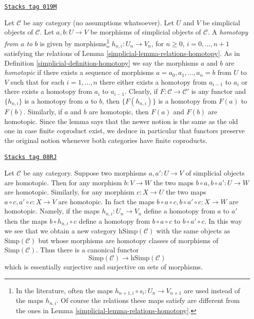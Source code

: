 \begin{remark}
\label{simplicial-remark-homotopy-better}
\href{https://stacks.math.columbia.edu/tag/019M}{\texttt{Stacks tag 019M}}

Let $\mathcal{C}$ be any category (no assumptions whatsoever). Let
$U$ and $V$ be simplicial objects of $\mathcal{C}$. Let $a, b : U \to V$
be morphisms of simplicial objects of $\mathcal{C}$. A
{\it homotopy from $a$ to $b$} is given by
morphisms\footnote{In the literature, often the maps
$h_{n + 1, i} \circ s_i : U_n \to V_{n + 1}$ are used instead
of the maps $h_{n, i}$. Of course the relations these maps satisfy
are different from the ones in Lemma \ref{simplicial-lemma-relations-homotopy}.}
$h_{n, i} : U_n \to V_n$, for $n \geq 0$, $i = 0, \ldots, n + 1$
satisfying the relations of Lemma \ref{simplicial-lemma-relations-homotopy}.
As in Definition \ref{simplicial-definition-homotopy} we say the morphisms $a$ and $b$
are {\it homotopic} if there exists a sequence of morphisms
$a = a_0, a_1, \ldots, a_n = b$ from $U$ to $V$ such that for each
$i = 1, \ldots, n$ there either exists a homotopy from $a_{i - 1}$ to $a_i$
or there exists a homotopy from $a_i$ to $a_{i - 1}$.
Clearly, if $F : \mathcal{C} \to \mathcal{C}'$ is any functor
and $\{h_{n, i}\}$ is a homotopy from $a$ to $b$, then
$\{F(h_{n, i})\}$ is a homotopy from $F(a)$ to $F(b)$.
Similarly, if $a$ and $b$ are homotopic, then $F(a)$ and $F(b)$
are homotopic.
Since the lemma says that the newer notion is the same
as the old one in case finite coproduct exist, we deduce
in particular that functors preserve the original notion
whenever both categories have finite coproducts.
\end{remark}

\begin{remark}
\label{simplicial-remark-homotopy-pre-post-compose}
\href{https://stacks.math.columbia.edu/tag/08RJ}{\texttt{Stacks tag 08RJ}}

Let $\mathcal{C}$ be any category. Suppose two morphisms $a, a' : U \to V$
of simplicial objects are homotopic. Then for any morphism $b : V \to W$
the two maps $b \circ a, b \circ a' : U \to W$ are homotopic.
Similarly, for any morphism $c : X \to U$ the two maps
$a \circ c, a' \circ c : X \to V$ are homotopic. In fact the maps
$b \circ a \circ c, b \circ a' \circ c : X \to W$ are homotopic.
Namely, if the maps $h_{n, i} : U_n \to V_n$ define a homotopy from
$a$ to $a'$ then the maps $b \circ h_{n, i} \circ c$ define a homotopy
from $b \circ a \circ c$ to $b \circ a' \circ c$. In this way we see that
we obtain a new category $\text{hSimp}(\mathcal{C})$ with the same
objects as $\text{Simp}(\mathcal{C})$ but whose morphisms are
homotopy classes of morphisms of $\text{Simp}(\mathcal{C})$.
Thus there is a canonical functor
$$
\text{Simp}(\mathcal{C})
\longrightarrow
\text{hSimp}(\mathcal{C})
$$
which is essentially surjective and surjective on sets of morphisms.
\end{remark}

